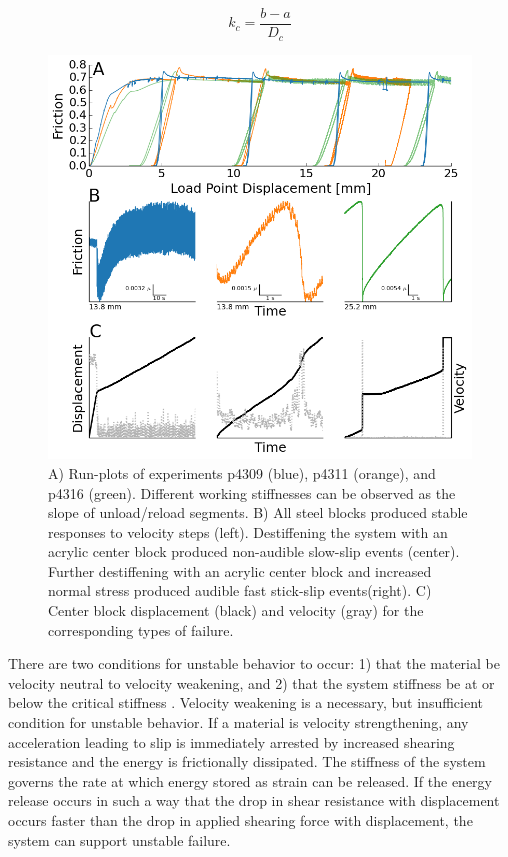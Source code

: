 \documentclass[11pt]{article}
\begin{document}
\begin{equation}
    k_c = \frac{b-a}{D_c}
	\label{equation:kc}
\end{equation}

\begin{figure}
	\centering
		\includegraphics[scale=0.7]{../Figures/Fig_Runplot/runplot.png}
   	\caption{A) Run-plots of experiments p4309 (blue), p4311 (orange), and p4316
   	(green). Different working stiffnesses can be observed as the slope of
   	unload/reload segments. B) All steel blocks produced stable responses to
   	velocity steps (left). Destiffening the system with an acrylic center block
   	produced non-audible slow-slip events (center). Further destiffening with an
   	acrylic center block and increased normal stress produced audible fast
   	stick-slip events(right). C) Center block displacement (black) and velocity
   	(gray) for the corresponding types of failure.}
  	\label{Figure:Runplot}
\end{figure}

There are two conditions for unstable behavior to occur: 1) that the material be
velocity neutral to velocity weakening, and 2) that the system stiffness be at
or below the critical stiffness \cite{Marone:1998, Scholz:2002}. Velocity
weakening is a necessary, but insufficient condition for unstable behavior. If a
material is velocity strengthening, any acceleration leading to slip is
immediately arrested by increased shearing resistance and the energy is
frictionally dissipated. The stiffness of the system governs the rate at which
energy stored as strain can be released. If the energy release occurs in such a
way that the drop in shear resistance with displacement occurs faster than the
drop in applied shearing force with displacement, the system can support
unstable failure.
\end{document}
